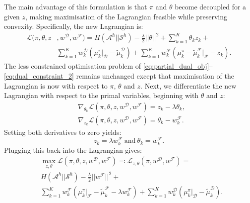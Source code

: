 \documentclass[letterpaper]{article}
\newcommand{\sw}[1]{\textcolor{red}{SW: #1}}
\newcommand{\jm}[1]{\textcolor{blue}{Joao: #1}}
\newcommand{\ks}[1]{\textcolor{green}{Kyriacos: #1}}
\newcommand{\sw}[1]{}
\newcommand{\jm}[1]{}
\newcommand{\ks}[1]{}
\begin{document}
The main advantage of this formulation is that $\pi$ and $\theta$ become decoupled for a given $z$, making maximisation of the Lagrangian feasible while preserving convexity. 
Specifically, the new Lagrangian is:
\begin{equation}
\begin{split}
\label{eq:partial_lagrangian_failure}
\mathcal{L}(\pi,\theta,z &,w^{\mathcal{D}},w^{\mathcal{F}})=  H(\mathcal{A}^h||\mathcal{S}^h) - \frac{\lambda}{2}||\theta||^2 + \sum_{k=1}^K\theta_kz_k+\\
&
\sum_{k=1}^Kw^{\mathcal{D}}_k(\mu^{\pi}_k|_{\mathcal{D}}-\widetilde{\mu}^{\mathcal{D}}_k) + 
\sum_{k=1}^Kw^{\mathcal{F}}_k (\mu^{\pi}_k -\widetilde{\mu}^{\mathcal{F}}_k|_{\mathcal{F}} - z_k).
\end{split}
\end{equation}
The less constrained optimisation problem of \eqref{eq:partial_dual_obj}--\eqref{eq:dual_constraint_2} remains unchanged except that maximisation of the Lagrangian is now with respect to $\pi$, $\theta$ and $z$.
Next, we differentiate the new Lagrangian with respect to the primal variables, beginning with $\theta$ and $z$:
\begin{align}
	&\nabla_{\theta_k}\mathcal{L}(\pi,\theta,z,w^{\mathcal{D}},w^{\mathcal{F}}) = z_k - \lambda\theta_k,\\
	&\nabla_{z_k}\mathcal{L}(\pi,\theta,z,w^{\mathcal{D}},w^{\mathcal{F}}) = \theta_k - w^{\mathcal{F}}_k.
\end{align}
Setting both derivatives to zero yields:
\begin{equation}
	z_k = \lambda w^{\mathcal{F}}_k~\mathrm{and}~\theta_k = w^{\mathcal{F}}_k.
\end{equation}
Plugging this back into the Lagrangian gives:
\begin{equation}
\begin{split}
\label{eq:partial_lagrangian_failure}
&\max_{z,\theta}\mathcal{L}(\pi,\theta,z,w^{\mathcal{D}},w^{\mathcal{F}})\eqqcolon \mathcal{L}_{z,\theta}(\pi,w^{\mathcal{D}},w^{\mathcal{F}}) =\\& H(\mathcal{A}^h||\mathcal{S}^h) - \frac{\lambda}{2}||w^{\mathcal{F}}||^2 +\\ 
&\sum_{k=1}^Kw^{\mathcal{F}}_k (\mu^{\pi}_k|_{\mathcal{F}} -\widetilde{\mu}^{\mathcal{F}}_k-\lambda w^{\mathcal{F}}_k) + \sum_{k=1}^Kw^{\mathcal{D}}_k(\mu^{\pi}_k|_{\mathcal{D}}-\widetilde{\mu}^{\mathcal{D}}_k).
\end{split}
\end{equation}
\end{document}
